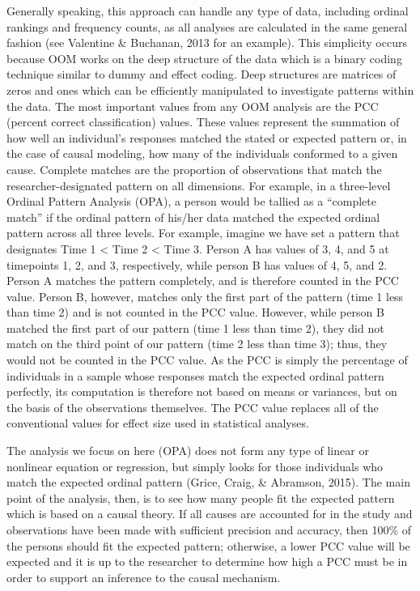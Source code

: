 \documentclass[,man, mask]{apa6}
\theoremstyle{definition}
\theoremstyle{definition}
\theoremstyle{definition}
\theoremstyle{remark}
\begin{document}
Generally speaking, this approach can handle any type of data, including
ordinal rankings and frequency counts, as all analyses are calculated in
the same general fashion (see Valentine \& Buchanan, 2013 for an
example). This simplicity occurs because OOM works on the deep structure
of the data which is a binary coding technique similar to dummy and
effect coding. Deep structures are matrices of zeros and ones which can
be efficiently manipulated to investigate patterns within the data. The
most important values from any OOM analysis are the PCC (percent correct
classification) values. These values represent the summation of how well
an individual's responses matched the stated or expected pattern or, in
the case of causal modeling, how many of the individuals conformed to a
given cause. Complete matches are the proportion of observations that
match the researcher-designated pattern on all dimensions. For example,
in a three-level Ordinal Pattern Analysis (OPA), a person would be
tallied as a \enquote{complete match} if the ordinal pattern of his/her
data matched the expected ordinal pattern across all three levels. For
example, imagine we have set a pattern that designates Time 1
\textless{} Time 2 \textless{} Time 3. Person A has values of 3, 4, and
5 at timepoints 1, 2, and 3, respectively, while person B has values of
4, 5, and 2. Person A matches the pattern completely, and is therefore
counted in the PCC value. Person B, however, matches only the first part
of the pattern (time 1 less than time 2) and is not counted in the PCC
value. However, while person B matched the first part of our pattern
(time 1 less than time 2), they did not match on the third point of our
pattern (time 2 less than time 3); thus, they would not be counted in
the PCC value. As the PCC is simply the percentage of individuals in a
sample whose responses match the expected ordinal pattern perfectly, its
computation is therefore not based on means or variances, but on the
basis of the observations themselves. The PCC value replaces all of the
conventional values for effect size used in statistical analyses.

The analysis we focus on here (OPA) does not form any type of linear or
nonlinear equation or regression, but simply looks for those individuals
who match the expected ordinal pattern (Grice, Craig, \& Abramson,
2015). The main point of the analysis, then, is to see how many people
fit the expected pattern which is based on a causal theory. If all
causes are accounted for in the study and observations have been made
with sufficient precision and accuracy, then 100\% of the persons should
fit the expected pattern; otherwise, a lower PCC value will be expected
and it is up to the researcher to determine how high a PCC must be in
order to support an inference to the causal mechanism.
\end{document}
